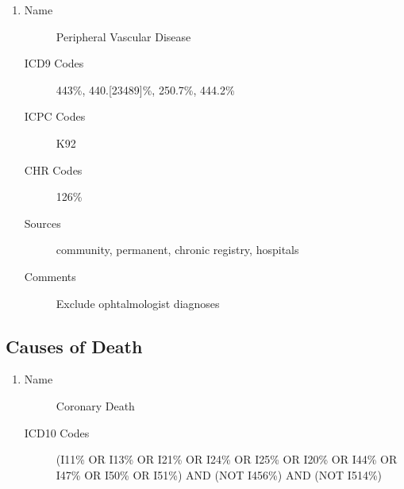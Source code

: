 \documentclass[a4paper,12pt]{article}
\begin{document}
\begin{appendices}
\begin{enumerate}
\begin{description}
   					\end{description}
   					\item
   					\begin{description}
   						\item[Name] Peripheral Vascular Disease
   						\item[ICD9 Codes] 443\%, 440.[23489]\%, 250.7\%, 444.2\%
   						\item[ICPC Codes] K92
   						\item[CHR Codes] 126\%
   						\item[Sources] community, permanent, chronic registry, hospitals
   						\item[Comments] Exclude ophtalmologist diagnoses
   					\end{description}
	   			\end{enumerate}
   			
   			\subsection{Causes of Death}
   				\begin{enumerate}
   					\item
   					\begin{description}
   						\item[Name] Coronary Death
   						\item[ICD10 Codes] (I11\% OR I13\% OR I21\% OR I24\% OR I25\% OR I20\% OR I44\% OR I47\% OR I50\% OR I51\%) AND (NOT I456\%) AND (NOT I514\%)
   					\end{description}
   				\end{enumerate}
	   			             

\end{appendices}
\end{document}

